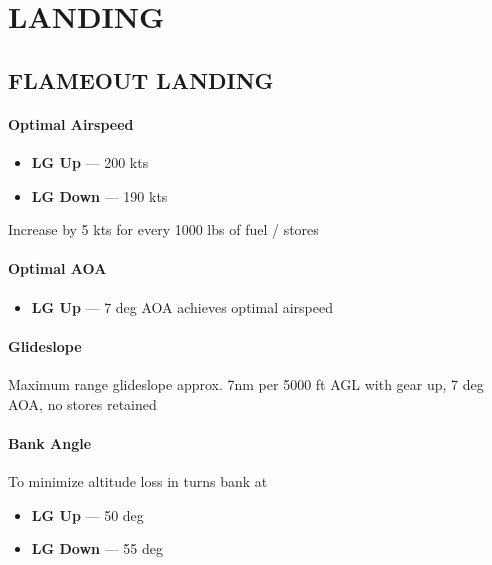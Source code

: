 \marginfigrestore

\clearpage

\section{LANDING}

\subsection{FLAMEOUT LANDING}
\label{subsec:proc_em:landing:flameout}


\paragraph{Optimal Airspeed}
\begin{itemize}
    \item \textbf{LG Up} --- 200 kts
    \item \textbf{LG Down} --- 190 kts
\end{itemize}

Increase by 5 kts for every 1000 lbs of fuel / stores

\paragraph{Optimal AOA}
\begin{itemize}
    \item \textbf{LG Up} --- 7 deg AOA achieves optimal airspeed
\end{itemize}

\paragraph{Glideslope} 
Maximum range glideslope
approx. 7nm per 5000 ft AGL with gear up,
7 deg AOA, no stores retained

\paragraph{Bank Angle}
To minimize altitude loss in turns bank at

\begin{itemize}
    \item \textbf{LG Up} --- 50 deg
    \item \textbf{LG Down} --- 55 deg  
\end{itemize}

